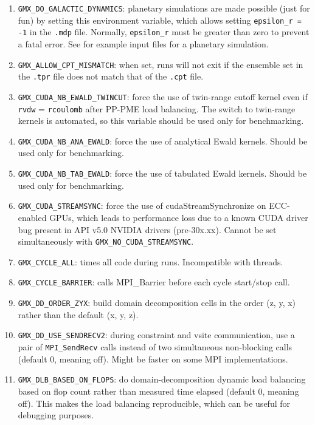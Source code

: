 \begin{enumerate}

\item   {\tt GMX_DO_GALACTIC_DYNAMICS}: planetary simulations are made possible (just for fun) by setting
        this environment variable, which allows setting {\tt epsilon_r = -1} in the {\tt .mdp}
        file. Normally, {\tt epsilon_r} must be greater than zero to prevent a fatal error.
        See {\wwwpage} for example input files for a planetary simulation.
\item   {\tt GMX_ALLOW_CPT_MISMATCH}: when set, runs will not exit if the
        ensemble set in the {\tt .tpr} file does not match that of the
        {\tt .cpt} file.
\item   {\tt GMX_CUDA_NB_EWALD_TWINCUT}: force the use of twin-range cutoff kernel even if {\tt rvdw} =
        {\tt rcoulomb} after PP-PME load balancing. The switch to twin-range kernels is automated,
        so this variable should be used only for benchmarking.
\item   {\tt GMX_CUDA_NB_ANA_EWALD}: force the use of analytical Ewald kernels. Should be used only for benchmarking.
\item   {\tt GMX_CUDA_NB_TAB_EWALD}: force the use of tabulated Ewald kernels. Should be used only for benchmarking.
\item   {\tt GMX_CUDA_STREAMSYNC}: force the use of cudaStreamSynchronize on ECC-enabled GPUs, which leads
        to performance loss due to a known CUDA driver bug present in API v5.0 NVIDIA drivers (pre-30x.xx).
        Cannot be set simultaneously with {\tt GMX_NO_CUDA_STREAMSYNC}.
\item   {\tt GMX_CYCLE_ALL}: times all code during runs.  Incompatible with threads.
\item   {\tt GMX_CYCLE_BARRIER}: calls MPI_Barrier before each cycle start/stop call.
\item   {\tt GMX_DD_ORDER_ZYX}: build domain decomposition cells in the order
        (z, y, x) rather than the default (x, y, z).
\item   {\tt GMX_DD_USE_SENDRECV2}: during constraint and vsite communication, use a pair
        of {\tt MPI_SendRecv} calls instead of two simultaneous non-blocking calls
        (default 0, meaning off). Might be faster on some MPI implementations.
\item   {\tt GMX_DLB_BASED_ON_FLOPS}: do domain-decomposition dynamic load balancing based on flop count rather than
        measured time elapsed (default 0, meaning off).
        This makes the load balancing reproducible, which can be useful for debugging purposes.

\end{enumerate}
